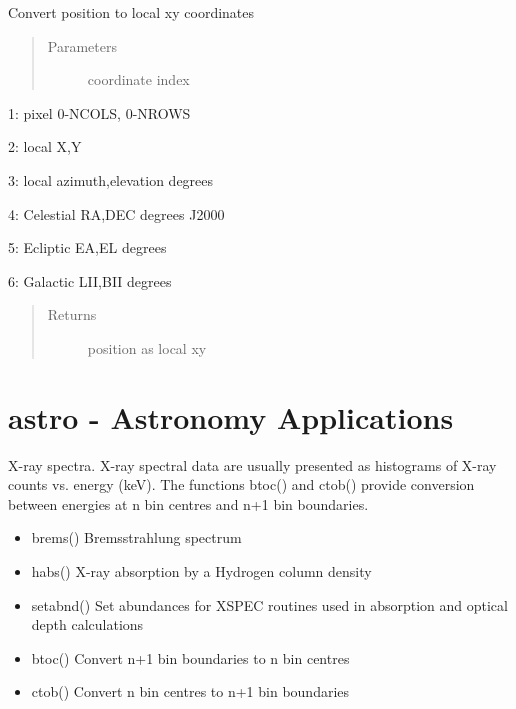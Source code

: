 \documentclass[letterpaper,10pt,english]{sphinxmanual}
\begin{document}
\begin{fulllineitems}
\label{\detokenize{images_functions:images.toxy}}
Convert position to local xy coordinates
\begin{quote}\begin{description}
\item[{Parameters}] \leavevmode
{} \textendash{} coordinate index

\end{description}\end{quote}

\begin{DUlineblock}{0em}
\item[] 1: pixel 0-NCOLS, 0-NROWS
\item[] 2: local X,Y
\item[] 3: local azimuth,elevation degrees
\item[] 4: Celestial RA,DEC degrees J2000
\item[] 5: Ecliptic EA,EL degrees
\item[] 6: Galactic LII,BII degrees
\end{DUlineblock}
\begin{quote}\begin{description}
\item[{Returns}] \leavevmode
position as local xy

\end{description}\end{quote}

\end{fulllineitems}



\chapter{astro  - Astronomy Applications}
\label{\detokenize{astro:astro-astronomy-applications}}\label{\detokenize{astro::doc}}
X-ray spectra. X-ray spectral data are usually presented as histograms of
X-ray counts vs. energy (keV). The functions btoc() and ctob() provide conversion between energies at n bin centres and n+1 bin boundaries.
\begin{itemize}
\item {} 
brems() Bremsstrahlung spectrum

\item {} 
habs() X-ray absorption by a Hydrogen column density

\item {} 
setabnd() Set abundances for XSPEC routines used in absorption and optical depth calculations

\item {} 
btoc() Convert n+1 bin boundaries to n bin centres

\item {} 
ctob() Convert n bin centres to n+1 bin boundaries

\end{itemize}
\end{document}
